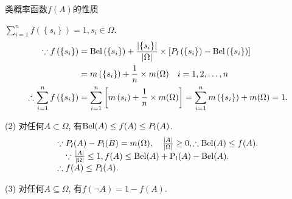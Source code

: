 类概率函数$f(A)$的性质

 $\sum_{i=1}^{n} f\left(\left\{s_{i}\right\}\right)=1, s_{i}\in \Omega$.
\begin{align*}
\because f\left(\left\{s_{i}\right\}\right) &=\textup{Bel}\left(\left\{s_{i}\right\}\right)+\frac{\left|\left\{s_{i}\right\}\right|}{|\Omega|} \times\left[P_l\left(\left\{s_{i}\right\}\right)-\textup{Bel}\left(\left\{s_{i}\right\}\right)\right] \notag\\
  &=m\left(\left\{s_{i}\right\}\right)+\frac{1}{n} \times m(\Omega) \quad i=1,2, \ldots, n \\
\therefore \sum_{i=1}^{n} f\left(\left\{s_{i}\right\}\right)
    &=\sum_{i=1}^{n}\left[m\left(s_{i}\right)+\frac{1}{n} \times m(\Omega)\right]
   =\sum_{i=1}^{n} m\left(\left\{s_{i}\right\}\right)+m(\Omega)=1.
\end{align*}

(2) 对任何$A\subset\Omega$, 有$\textup{Bel}(A)\leq f(A)\leq P_l(A)$.
\begin{align}
\begin{array}{l}
 \because P_l(A)-P_l(B)=m(\Omega), \quad \frac{|A|}{|\Omega|} \geq 0, \therefore \textup{Bel}(A) \leq f(A). \\
 {\quad \because \frac{|A|}{|\Omega|} \leq 1, f(A) \leq \textup{Bel}(A)+\textup{P}_l(A)-\textup{Bel}(A)}.\\
  \therefore f(A) \leq P_l(A).
  \end{array}
\end{align}

(3) 对任何$A \subseteq \Omega$, 有$f(\neg A)=1-f(A)$.

